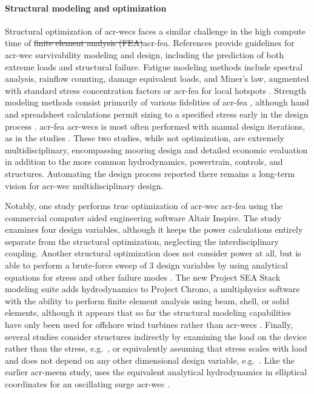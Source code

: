 \documentclass[a4paper,fleqn,colorlinks,unicode,lineno]{cas-dc} %
\makeatletter
\providecommand{\DIFaddtex}[1]{{\protect\color{blue}\uwave{#1}}} %
\providecommand{\DIFdeltex}[1]{{\protect\color{red}\sout{#1}}} %
\providecommand{\DIFaddbegin}{} %
\providecommand{\DIFaddend}{} %
\providecommand{\DIFdelbegin}{} %
\providecommand{\DIFdelend}{} %
\providecommand{\DIFadd}[1]{\texorpdfstring{\DIFaddtex{#1}}{#1}} %
\providecommand{\DIFdel}[1]{\texorpdfstring{\DIFdeltex{#1}}{}} %
\providecommand{\DIFscaledelfig}{0.5}
\newlength{\DIFdelgraphicswidth} %
\newlength{\DIFdelgraphicsheight} %
\providecommand{\DIFaddincludegraphics}[2][]{{\color{blue}\fbox{\DIFOincludegraphics[#1]{#2}}}} %
\providecommand{\DIFdelincludegraphics}[2][]{%
\sbox{\DIFdelgraphicsbox}{\DIFOincludegraphics[#1]{#2}}%
\settoboxwidth{\DIFdelgraphicswidth}{\DIFdelgraphicsbox} %
\settoboxtotalheight{\DIFdelgraphicsheight}{\DIFdelgraphicsbox} %
\scalebox{\DIFscaledelfig}{%
\parbox[b]{\DIFdelgraphicswidth}{\usebox{\DIFdelgraphicsbox}\\[-\baselineskip] \rule{\DIFdelgraphicswidth}{0em}}\llap{\resizebox{\DIFdelgraphicswidth}{\DIFdelgraphicsheight}{%
\setlength{\unitlength}{\DIFdelgraphicswidth}%
\begin{picture}(1,1)%
\thicklines\linethickness{2pt} %
{\color[rgb]{1,0,0}\put(0,0){\framebox(1,1){}}}%
{\color[rgb]{1,0,0}\put(0,0){\line( 1,1){1}}}%
{\color[rgb]{1,0,0}\put(0,1){\line(1,-1){1}}}%
\end{picture}%
}\hspace*{3pt}}} %
} %
\DeclareRobustCommand{\DIFaddbegin}{\DIFOaddbegin \let\includegraphics\DIFaddincludegraphics} %
\DeclareRobustCommand{\DIFaddend}{\DIFOaddend \let\includegraphics\DIFOincludegraphics} %
\DeclareRobustCommand{\DIFdelbegin}{\DIFOdelbegin \let\includegraphics\DIFdelincludegraphics} %
\DeclareRobustCommand{\DIFdelend}{\DIFOaddend \let\includegraphics\DIFOincludegraphics} %
\let\sout@orig\sout %
\renewcommand{\sout}[1]{\ifmmode\text{\sout@orig{\ensuremath{#1}}}\else\sout@orig{#1}\fi} %
\makeatother
\begin{document}
    \paragraph{Structural modeling and optimization}
    Structural optimization of \glspl{acr-wec} faces a similar challenge in the high compute time of \DIFdelbegin \DIFdel{finite element analysis (FEA)}\DIFdelend \DIFaddbegin \gls{acr-fea}\DIFaddend .
    References \citep{coe_survey_2018, ove_arup__partners_ltd_structural_2016,paduano_towards_2024,giannini_wave_2022} provide guidelines for \gls{acr-wec} survivability modeling and design, including the prediction of both extreme loads and structural failure.
    Fatigue modeling methods include spectral analysis, rainflow counting, damage equivalent loads, and Miner's law, augmented with standard stress concentration factors or \gls{acr-fea} for local hotspots \citep{ove_arup__partners_ltd_structural_2016}.
    Strength modeling methods consist primarily of various fidelities of \gls{acr-fea} , although hand and spreadsheet calculations permit sizing to a specified stress early in the design process \citep{ove_arup__partners_ltd_structural_2016}.
    \gls{acr-fea} \DIFadd{of }\glspl{acr-wec} is most often performed with manual design iterations, as in the studies \citep{RM3,mi_multi-scale_2025}.
    These two studies, while not optimization, are extremely multidisciplinary, encompassing mooring design and detailed economic evaluation in addition to the more common hydrodynamics, powertrain, controls, and structures.
    Automating the design process reported there remains a long-term vision for \gls{acr-wec} multidisciplinary design.

    Notably, one study \citep{an_optimal_2024} performs true optimization of \gls{acr-wec} \DIFadd{structural }\gls{acr-fea} using the commercial computer aided engineering software Altair Inspire.
    The study examines four design variables, although it keeps the power calculations entirely separate from the structural optimization, neglecting the interdisciplinary coupling.
    Another structural optimization does not consider power at all, but is able to perform a brute-force sweep of 3 design variables by using analytical equations for stress and other failure modes \citep{ambuhl_reliability-based_2014}.
    The new Project SEA Stack modeling suite adds hydrodynamics to Project Chrono, a multiphysics software with the ability to perform finite element analysis using beam, shell, or solid elements, although it appears that so far the structural modeling capabilities have only been used for offshore wind turbines rather than \glspl{acr-wec} \citep{ogden_hydrochrono_2023}.
    Finally, several studies consider structures indirectly by examining the load on the device rather than the stress, e.g.\ \citep{nguyen_theoretical_2024, ferri_balancing_2014}, or equivalently assuming that stress scales with load and does not depend on any other dimensional design variable, e.g.\ \citep{garcia-teruel_reliability-based_2021, cotten_multi-objective_2022}.
    Like the earlier \gls{acr-meem} study, \citet{nguyen_theoretical_2024} uses the equivalent analytical hydrodynamics in elliptical coordinates for an oscillating surge \gls{acr-wec} .
\end{document}
